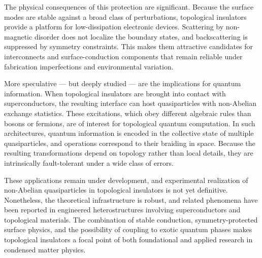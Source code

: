 The physical consequences of this protection are significant. Because the surface modes are stable against a broad class of perturbations, topological insulators provide a platform for low-dissipation electronic devices. Scattering by non-magnetic disorder does not localize the boundary states, and backscattering is suppressed by symmetry constraints. This makes them attractive candidates for interconnects and surface-conduction components that remain reliable under fabrication imperfections and environmental variation.

More speculative — but deeply studied — are the implications for quantum information. When topological insulators are brought into contact with superconductors, the resulting interface can host quasiparticles with non-Abelian exchange statistics. These excitations, which obey different algebraic rules than bosons or fermions, are of interest for topological quantum computation. In such architectures, quantum information is encoded in the collective state of multiple quasiparticles, and operations correspond to their braiding in space. Because the resulting transformations depend on topology rather than local details, they are intrinsically fault-tolerant under a wide class of errors.

These applications remain under development, and experimental realization of non-Abelian quasiparticles in topological insulators is not yet definitive. Nonetheless, the theoretical infrastructure is robust, and related phenomena have been reported in engineered heterostructures involving superconductors and topological materials. The combination of stable conduction, symmetry-protected surface physics, and the possibility of coupling to exotic quantum phases makes topological insulators a focal point of both foundational and applied research in condensed matter physics.

